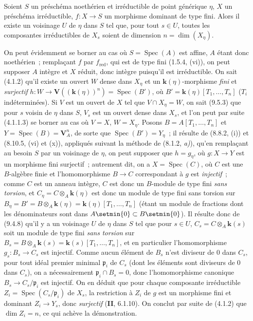 \begin{corollary}[9.5.6]
\label{IV.9.5.6-fr}
Soient $S$ un préschéma noethérien et irréductible de point générique $\eta$,
$X$ un préschéma irréductible, $f:X\to S$ un morphisme dominant de type fini.
Alors il existe un voisinage $U$ de $\eta$ dans $S$ tel que, pour tout
$s\in U$, toutes les composantes irréductibles de $X_s$ soient de dimension
$n=\dim(X_\eta)$.
\end{corollary}

On peut évidemment se borner au cas où $S=\operatorname{Spec}(A)$ est affine,
$A$ étant donc noethérien~; remplaçant $f$ par $f_{\mathrm{red}}$, qui est de
type fini (1.5.4, (vi)), on peut
supposer $A$ intègre et $X$ réduit, donc intègre puisqu'il est irréductible. On
sait (4.1.2) qu'il existe un ouvert $W$ dense dans $X_\eta$ et un
$\boldsymbol{k}(\eta)$-morphisme \emph{fini} et \emph{surjectif}
$h:W\to\mathbf V((\boldsymbol{k}(\eta))^n)=\operatorname{Spec}(B')$, où
$B'=\boldsymbol{k}(\eta)[T_1,\ldots,T_n]$ ($T_i$ indéterminées). Si $V$ est un ouvert de
$X$ tel que $V\cap X_\eta=W$, on sait (9.5.3) que pour $s$ voisin de $\eta$
dans $S$, $V_s$ est un ouvert dense dans $X_s$, et l'on peut par suite (4.1.1.3)
se borner au cas où $V=X$, $W=X_\eta$. Posons
$B=A[T_1,\ldots,T_n]$ et $Y=\operatorname{Spec}(B)=\mathbf V_A^n$, de sorte
que $\operatorname{Spec}(B')=Y_\eta$~; il résulte de (8.8.2, (i)) et
(8.10.5, (vi) et (x)), appliqués suivant la méthode de (8.1.2, \emph{a)}),
qu'en remplaçant au besoin $S$ par un voisinage de $\eta$, on peut supposer que
$h=g_\eta$, où $g:X\to Y$ est un morphisme fini surjectif~; autrement dit, on
a $X=\operatorname{Spec}(C)$, où $C$ est une $B$-algèbre finie et
l'homomorphisme $B\to C$ correspondant à $g$ est \emph{injectif}~; comme $C$
est un anneau intègre, $C$ est donc un $B$-module de type fini \emph{sans
torsion}, et $C_\eta=C\otimes_A \boldsymbol{k}(\eta)$ est donc un module de type fini sans
torsion sur $B_\eta=B'=B\otimes_A \boldsymbol{k}(\eta)=\boldsymbol{k}(\eta)[T_1,\ldots,T_n]$ (étant un
module de fractions dont les dénominateurs sont dans
$A\setmin\{0\}\subset B\setmin\{0\}$). Il résulte donc de (9.4.8) qu'il y a un voisinage
$U$ de $\eta$ dans $S$ tel que pour $s\in U$,
$C_s=C\otimes_A \boldsymbol{k}(s)$ soit un module de type fini \emph{sans torsion} sur
$B_s=B\otimes_A \boldsymbol{k}(s)=\boldsymbol{k}(s)[T_1,\ldots,T_n]$, et en particulier l'homomorphisme
$g_s:B_s\to C_s$ est injectif. Comme aucun élément de $B_s$ n'est diviseur de
0 dans $C_s$, pour tout idéal premier minimal $\mathfrak p_i$ de $C_s$ (dont
les éléments sont diviseurs de 0 dans $C_s$), on a nécessairement
$\mathfrak p_i\cap B_s=0$, donc l'homomorphisme canonique
$B_s\to C_s/\mathfrak p_i$ est injectif. On en déduit que pour chaque
composante irréductible $Z_i=\operatorname{Spec}(C_s/\mathfrak p_i)$ de $X_s$,
la restriction à $Z_i$ de $g$ est un morphisme fini et dominant $Z_i\to Y_s$,
donc \emph{surjectif} (\textbf{II}, 6.1.10). On conclut par suite de (4.1.2)
que $\dim Z_i=n$, ce qui achève la démonstration.

